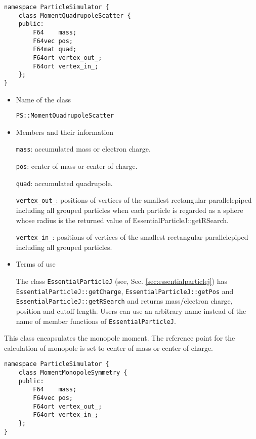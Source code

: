 \begin{screen}
\begin{verbatim}
namespace ParticleSimulator {
    class MomentQuadrupoleScatter {
    public:
        F64    mass;
        F64vec pos;
        F64mat quad;
        F64ort vertex_out_;
        F64ort vertex_in_;
    };
}
\end{verbatim}
\end{screen}

\begin{itemize}
\item Name of the class
        
  \texttt{PS::MomentQuadrupoleScatter}

\item Members and their information

  \texttt{mass}: accumulated mass or electron charge.

  \texttt{pos}: center of mass or center of charge.
        
  \texttt{quad}: accumulated quadrupole.
        
  \texttt{vertex\_out\_}: positions of vertices of the smallest rectangular parallelepiped including all grouped particles when each particle is regarded as a sphere whose radius is the returned value of EssentialParticleJ::getRSearch.
  
  \texttt{vertex\_in\_}: positions of vertices of the smallest rectangular parallelepiped including all grouped particles.

\item Terms of use

  The class \texttt{EssentialParticleJ} (see, Sec. \ref{sec:essentialparticlej}) has \texttt{EssentialParticleJ::getCharge}, \texttt{EssentialParticleJ::getPos} and \texttt{EssentialParticleJ::getRSearch} and returns mass/electron charge, position and cutoff length. Users can use an arbitrary name instead of the name of member functions of \texttt{EssentialParticleJ}.

\end{itemize}


\label{sec:MomentMonopoleSymmetry}

This class encapsulates the monopole moment. The reference point for the calculation of monopole is set to center of mass or center of charge.

\begin{screen}
\begin{verbatim}
namespace ParticleSimulator {
    class MomentMonopoleSymmetry {
    public:
        F64    mass;
        F64vec pos;
        F64ort vertex_out_;
        F64ort vertex_in_;
    };
}
\end{verbatim}
\end{screen}

